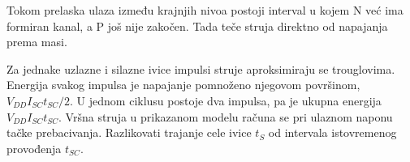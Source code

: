 Tokom prelaska ulaza između krajnjih nivoa postoji interval u kojem N već ima formiran kanal, a P još nije zakočen. Tada teče struja direktno od napajanja prema masi.

Za jednake uzlazne i silazne ivice impulsi struje aproksimiraju se trouglovima. Energija svakog impulsa je napajanje pomnoženo njegovom površinom, $V_{DD}I_{SC}t_{SC}/2$. U jednom ciklusu postoje dva impulsa, pa je ukupna energija $V_{DD}I_{SC}t_{SC}$. Vršna struja u prikazanom modelu računa se pri ulaznom naponu tačke prebacivanja. Razlikovati trajanje cele ivice $t_S$ od intervala istovremenog provođenja $t_{SC}$.

